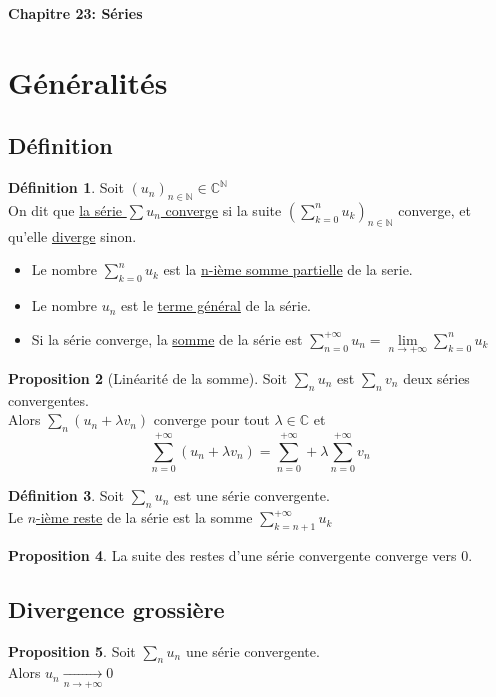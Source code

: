 \documentclass[10pt,a4paper]{article}
\theoremstyle{definition}
\newtheorem{proposition}{Proposition}[section]
\newtheorem{definition}[proposition]{Définition}
\begin{document}
\renewcommand{\labelitemi}{$*$}
\begin{center}
{\Large \textbf{Chapitre 23: Séries}}
\end{center}

\section{Généralités}
\subsection{Définition}
\begin{definition}
Soit $(u_n)_{n \in \mathbb{N}} \in \mathbb{C}^{\mathbb{N}}$ \\
On dit que \uline{la série $\sum u_n$ converge} si la suite $\left( \sum\limits_{k = 0}^n u_k \right)_{n \in \mathbb{N}}$ converge, et qu'elle \uline{diverge} sinon.
\begin{itemize}
\item Le nombre $\sum\limits_{k = 0}^n u_k$ est la \uline{n-ième somme partielle} de la serie.
\item Le nombre $u_n$ est le \uline{terme général} de la série.
\item Si la série converge, la \uline{somme} de la série est $\sum\limits_{n = 0}^{+\infty} u_n = \lim\limits_{n \to +\infty} \sum\limits_{k = 0}^{n} u_k$
\end{itemize}
\end{definition}
\begin{proposition}[Linéarité de la somme]
Soit $\sum\limits_n u_n$ est $\sum\limits_n v_n$ deux séries convergentes. \\
Alors $\sum\limits_n (u_n + \lambda v_n)$ converge pour tout $\lambda \in \mathbb{C}$ et
\[\sum\limits_{n = 0}^{+\infty} (u_n + \lambda v_n) = \sum\limits_{n = 0}^{+\infty} + \lambda \sum\limits_{n = 0}^{+\infty} v_n\]
\end{proposition}
\begin{definition}
Soit $\sum\limits_n u_n$ est une série convergente. \\
Le \uline{$n$-ième reste} de la série est la somme $\sum\limits_{k = n + 1}^{+\infty} u_k$
\end{definition}
\begin{proposition}
La suite des restes d'une série convergente converge vers $0$.
\end{proposition}

\subsection{Divergence grossière}
\begin{proposition}
Soit $\sum\limits_n u_n$ une série convergente. \\
Alors $u_n \xrightarrow[n \to +\infty]{} 0$
\end{proposition}
 
\end{document}
